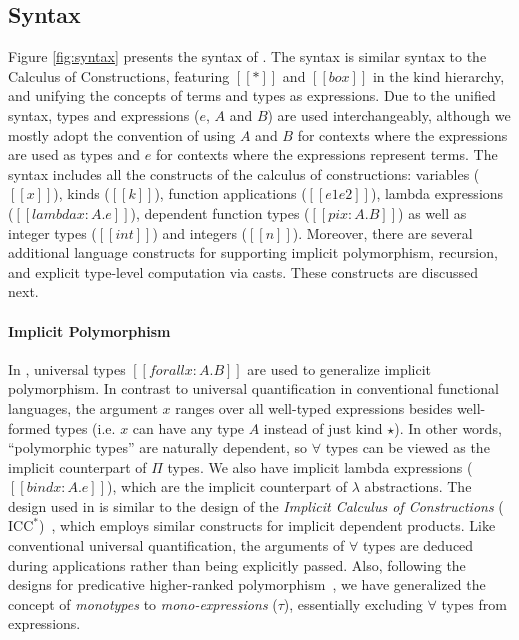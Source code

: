 \subsection{Syntax}

Figure \ref{fig:syntax} presents the syntax of \name. The syntax is similar
syntax to the Calculus of Constructions, featuring
$[[*]]$ and $[[box]]$ in the kind hierarchy, and unifying the concepts of terms
and types as expressions. Due to the unified syntax, types and
expressions ($e$, $A$ and $B$) are used
interchangeably, although we mostly adopt the convention of using $A$ and $B$
for contexts where the expressions are used as types and $e$ for contexts
where the expressions represent terms.
The syntax includes all the constructs of the calculus of constructions:
variables ($[[x]]$), kinds ($[[k]]$), function applications  ($[[e1 e2]]$),
lambda expressions ($[[lambda x : A. e]]$), dependent function types ($[[pi x : A. B]]$)
as well as integer types ($[[int]]$) and integers ($[[n]]$).
Moreover, there are several additional language constructs for
supporting implicit polymorphism, recursion, and explicit type-level computation
via casts. These constructs are discussed next.

\paragraph{Implicit Polymorphism}
In \name, universal types $[[forall x : A. B]]$ are used to generalize implicit
polymorphism.
In contrast to universal quantification in conventional functional languages, the
argument $x$ ranges over all well-typed expressions besides well-formed
types (i.e. $x$ can have any type $A$ instead of just kind $\star$).
In other words, ``polymorphic types'' are naturally dependent, so $\forall$
types can be viewed as the implicit counterpart of $\Pi$ types. We also have
implicit lambda expressions ($[[bind x : A. e]]$), which are the implicit counterpart of
  $\lambda$ abstractions. The design used in \name
  is similar to the design of the \emph{Implicit Calculus of Constructions} ($\text{ICC}^*$)~\cite{barras2008implicit}, which
  employs similar constructs for implicit dependent products.
Like conventional universal quantification, the arguments of $\forall$ types are
deduced during applications rather than being explicitly passed.
Also, following the designs for predicative higher-ranked polymorphism~\cite{odersky1996putting,dunfield2013complete,jones2007practical},
we have generalized the concept of \emph{monotypes} to
\emph{mono-expressions} ($\tau$), essentially excluding $\forall$ types from expressions.

